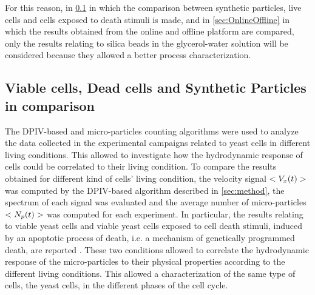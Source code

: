 \documentclass[journal]{IEEEtran}
\theoremstyle{definition}
\theoremstyle{remark}
\begin{document}
For this reason, in \sect\ref{sec:comparison} in which the comparison between synthetic particles, live cells and cells exposed to death stimuli is made, and in \sect\ref{sec:OnlineOffline} in which the results obtained from the online and offline platform are compared, only the results relating to silica beads in the glycerol-water solution will be considered because they allowed a better process characterization.
 
\subsection{Viable cells, Dead cells and Synthetic Particles in comparison}\label{sec:comparison}

The DPIV-based and micro-particles counting algorithms were used to analyze the data collected in the experimental campaigns related to yeast cells in different living conditions. This allowed to investigate how the hydrodynamic response of cells could be correlated to their living condition.  To compare the results obtained for different kind of cells' living condition, the velocity signal $<V_{x}(t)>$ was computed by the DPIV-based algorithm described in \sect\ref{sec:method}, the spectrum of each signal was evaluated and the average number of micro-particles $<N_p(t)>$ was computed for each experiment. 
In particular, the results relating to viable yeast cells and viable yeast cells exposed to cell death stimuli, induced by an apoptotic process of death, i.e. a mechanism of genetically programmed death, are reported . These two conditions allowed to correlate the hydrodynamic response of the micro-particles to their physical properties according to the different living conditions. This allowed a characterization of the same type of cells, the yeast cells, in the different phases of the cell cycle.
\end{document}
